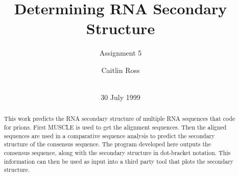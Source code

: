 \documentclass{acm_proc_article-sp}
\begin{document}
\title{Determining RNA Secondary Structure}
\subtitle{Assignment 5}
%
%
%
%
%

%
\author{
	\alignauthor Caitlin Ross\\
	 \\
}

\date{30 July 1999}

\maketitle

\begin{abstract}
This work predicts the RNA secondary structure of multiple RNA sequences that code for prions.  First MUSCLE is used to get the alignment sequences.  Then the aligned sequences are used in a comparative sequence analysis to predict the secondary structure of the consensus sequence.  The program developed here outputs the consensus sequence, along with the secondary structure in dot-bracket notation.  This information can then be used as input into a third party tool that plots the secondary structure.  
\end{abstract}
\end{document}
